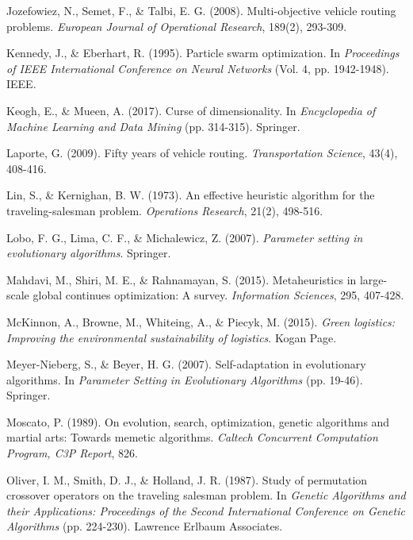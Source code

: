 \documentclass[12pt,a4paper]{article}
\begin{document}
\begin{thebibliography}{99}
Jozefowiez, N., Semet, F., \& Talbi, E. G. (2008). Multi-objective vehicle routing problems. \textit{European Journal of Operational Research}, 189(2), 293-309.

Kennedy, J., \& Eberhart, R. (1995). Particle swarm optimization. In \textit{Proceedings of IEEE International Conference on Neural Networks} (Vol. 4, pp. 1942-1948). IEEE.

Keogh, E., \& Mueen, A. (2017). Curse of dimensionality. In \textit{Encyclopedia of Machine Learning and Data Mining} (pp. 314-315). Springer.

Laporte, G. (2009). Fifty years of vehicle routing. \textit{Transportation Science}, 43(4), 408-416.

Lin, S., \& Kernighan, B. W. (1973). An effective heuristic algorithm for the traveling-salesman problem. \textit{Operations Research}, 21(2), 498-516.

Lobo, F. G., Lima, C. F., \& Michalewicz, Z. (2007). \textit{Parameter setting in evolutionary algorithms}. Springer.

Mahdavi, M., Shiri, M. E., \& Rahnamayan, S. (2015). Metaheuristics in large-scale global continues optimization: A survey. \textit{Information Sciences}, 295, 407-428.

McKinnon, A., Browne, M., Whiteing, A., \& Piecyk, M. (2015). \textit{Green logistics: Improving the environmental sustainability of logistics}. Kogan Page.

Meyer-Nieberg, S., \& Beyer, H. G. (2007). Self-adaptation in evolutionary algorithms. In \textit{Parameter Setting in Evolutionary Algorithms} (pp. 19-46). Springer.

Moscato, P. (1989). On evolution, search, optimization, genetic algorithms and martial arts: Towards memetic algorithms. \textit{Caltech Concurrent Computation Program, C3P Report}, 826.

Oliver, I. M., Smith, D. J., \& Holland, J. R. (1987). Study of permutation crossover operators on the traveling salesman problem. In \textit{Genetic Algorithms and their Applications: Proceedings of the Second International Conference on Genetic Algorithms} (pp. 224-230). Lawrence Erlbaum Associates.


\end{thebibliography}
\end{document}
